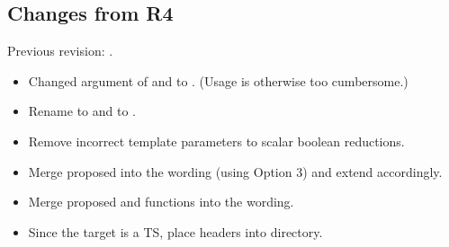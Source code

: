 \subsection{Changes from R4}
Previous revision: \parencite{P0214R4}.
\begin{itemize}
  \item Changed  argument of  and  to .
    (Usage is otherwise too cumbersome.)
  \item Rename  to  and  to .
  \item Remove incorrect template parameters to scalar boolean reductions.
  \item Merge proposed  into the wording (using Option 3) and extend  accordingly.
  \item Merge proposed  and  functions into the wording.
  \item Since the target is a TS, place headers into  directory.
\end{itemize}








